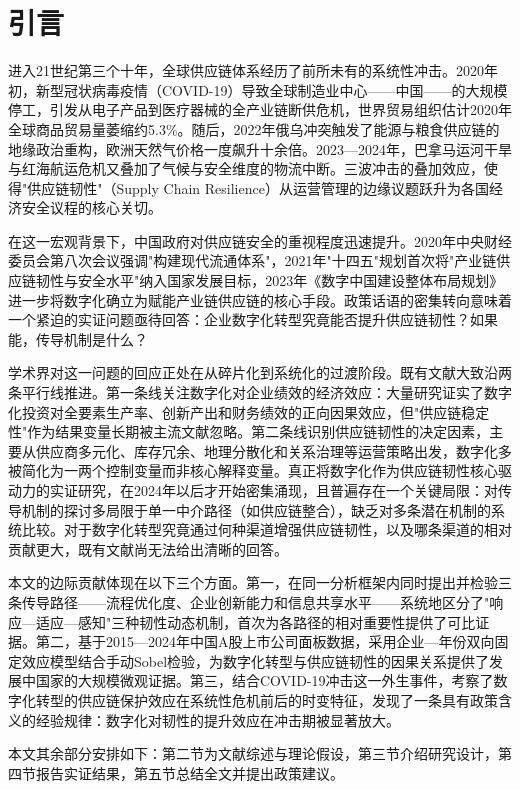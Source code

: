 \section{引言}

进入21世纪第三个十年，全球供应链体系经历了前所未有的系统性冲击。2020年初，新型冠状病毒疫情（COVID-19）导致全球制造业中心——中国——的大规模停工，引发从电子产品到医疗器械的全产业链断供危机，世界贸易组织估计2020年全球商品贸易量萎缩约5.3\%。随后，2022年俄乌冲突触发了能源与粮食供应链的地缘政治重构，欧洲天然气价格一度飙升十余倍。2023—2024年，巴拿马运河干旱与红海航运危机又叠加了气候与安全维度的物流中断。三波冲击的叠加效应，使得"供应链韧性"（Supply Chain Resilience）从运营管理的边缘议题跃升为各国经济安全议程的核心关切。

在这一宏观背景下，中国政府对供应链安全的重视程度迅速提升。2020年中央财经委员会第八次会议强调"构建现代流通体系"，2021年"十四五"规划首次将"产业链供应链韧性与安全水平"纳入国家发展目标，2023年《数字中国建设整体布局规划》进一步将数字化确立为赋能产业链供应链的核心手段。政策话语的密集转向意味着一个紧迫的实证问题亟待回答：企业数字化转型究竟能否提升供应链韧性？如果能，传导机制是什么？

学术界对这一问题的回应正处在从碎片化到系统化的过渡阶段。既有文献大致沿两条平行线推进。第一条线关注数字化对企业绩效的经济效应：大量研究证实了数字化投资对全要素生产率、创新产出和财务绩效的正向因果效应\cite{wu2025impact,chen2025supply}，但"供应链稳定性"作为结果变量长期被主流文献忽略。第二条线识别供应链韧性的决定因素，主要从供应商多元化、库存冗余、地理分散化和关系治理等运营策略出发\cite{ivanov2021digital,faruquee2021strategic}，数字化多被简化为一两个控制变量而非核心解释变量。真正将数字化作为供应链韧性核心驱动力的实证研究，在2024年以后才开始密集涌现\cite{li2025digital,zhang2024supply,liude2025supply}，且普遍存在一个关键局限：对传导机制的探讨多局限于单一中介路径（如供应链整合），缺乏对多条潜在机制的系统比较。对于数字化转型究竟通过何种渠道增强供应链韧性，以及哪条渠道的相对贡献更大，既有文献尚无法给出清晰的回答。

本文的边际贡献体现在以下三个方面。第一，在同一分析框架内同时提出并检验三条传导路径——流程优化度、企业创新能力和信息共享水平——系统地区分了"响应—适应—感知"三种韧性动态机制，首次为各路径的相对重要性提供了可比证据。第二，基于2015—2024年中国A股上市公司面板数据，采用企业—年份双向固定效应模型结合手动Sobel检验，为数字化转型与供应链韧性的因果关系提供了发展中国家的大规模微观证据。第三，结合COVID-19冲击这一外生事件，考察了数字化转型的供应链保护效应在系统性危机前后的时变特征，发现了一条具有政策含义的经验规律：数字化对韧性的提升效应在冲击期被显著放大。

本文其余部分安排如下：第二节为文献综述与理论假设，第三节介绍研究设计，第四节报告实证结果，第五节总结全文并提出政策建议。